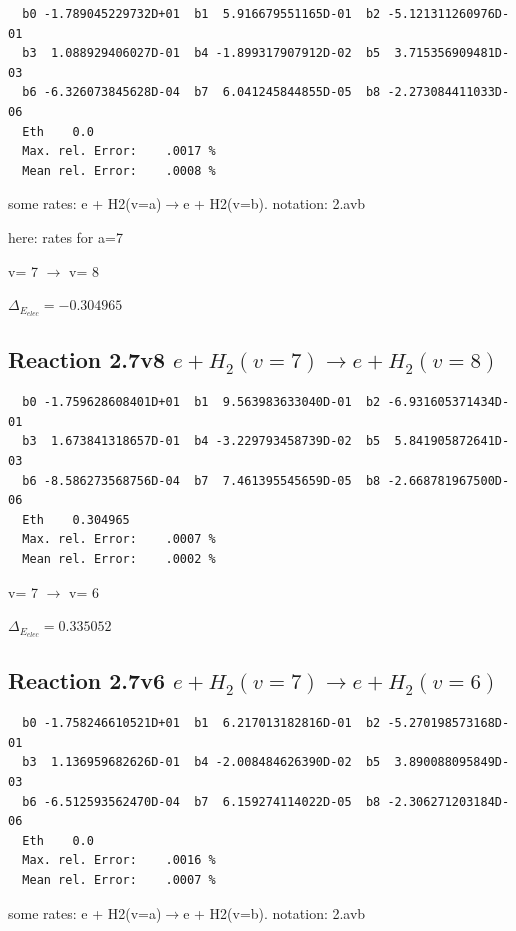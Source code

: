 \documentclass[12pt,dvipdfmx]{article}
\begin{document}
\begin{small}\begin{verbatim}
  b0 -1.789045229732D+01  b1  5.916679551165D-01  b2 -5.121311260976D-01
  b3  1.088929406027D-01  b4 -1.899317907912D-02  b5  3.715356909481D-03
  b6 -6.326073845628D-04  b7  6.041245844855D-05  b8 -2.273084411033D-06
  Eth    0.0
  Max. rel. Error:    .0017 %
  Mean rel. Error:    .0008 %

\end{verbatim}\end{small}

\newpage
some rates: e + H2(v=a)$\rightarrow$e + H2(v=b). notation: 2.avb

here: rates for a=7

  v=  7 $\rightarrow$ v= 8

$\Delta_{E_{elec}}=-0.304965$


\subsection{
Reaction 2.7v8
$ e + H_2(v=7) \rightarrow e + H_2(v=8) $
}


\begin{small}\begin{verbatim}
  b0 -1.759628608401D+01  b1  9.563983633040D-01  b2 -6.931605371434D-01
  b3  1.673841318657D-01  b4 -3.229793458739D-02  b5  5.841905872641D-03
  b6 -8.586273568756D-04  b7  7.461395545659D-05  b8 -2.668781967500D-06
  Eth    0.304965
  Max. rel. Error:    .0007 %
  Mean rel. Error:    .0002 %

\end{verbatim}\end{small}

  v=  7 $\rightarrow$ v= 6

$\Delta_{E_{elec}}= 0.335052$


\subsection{
Reaction 2.7v6
$ e + H_2(v=7) \rightarrow e + H_2(v=6) $
}


\begin{small}\begin{verbatim}
  b0 -1.758246610521D+01  b1  6.217013182816D-01  b2 -5.270198573168D-01
  b3  1.136959682626D-01  b4 -2.008484626390D-02  b5  3.890088095849D-03
  b6 -6.512593562470D-04  b7  6.159274114022D-05  b8 -2.306271203184D-06
  Eth    0.0
  Max. rel. Error:    .0016 %
  Mean rel. Error:    .0007 %

\end{verbatim}\end{small}
\newpage
some rates: e + H2(v=a)$\rightarrow$e + H2(v=b). notation: 2.avb
\end{document}
